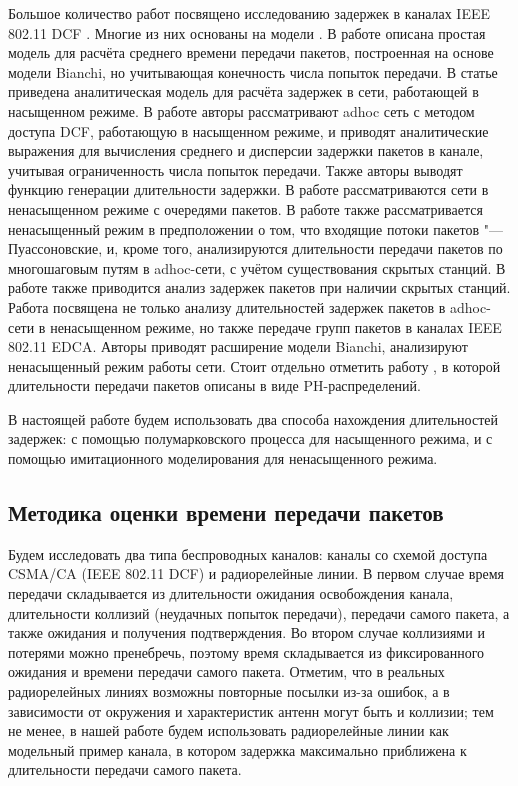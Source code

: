 Большое количество работ посвящено исследованию задержек в каналах IEEE 802.11 DCF \cite{Banchs2006,Chatzimisios2002,Dai2013,Dong2008,Felemban2011,Haghani2011,Hung2007,Issariyakul2005,Sakurai2007,Tickoo2008,Vardakas2007}. Многие из них основаны на модели \cite{Bianchi2000}. В работе \cite{Chatzimisios2002} описана простая модель для расчёта среднего времени передачи пакетов, построенная на основе модели Bianchi, но учитывающая конечность числа попыток передачи. В статье \cite{Banchs2006} приведена аналитическая модель для расчёта задержек в сети, работающей в насыщенном режиме. В работе \cite{Sakurai2007} авторы рассматривают adhoc сеть с методом доступа DCF, работающую в насыщенном режиме, и приводят аналитические выражения для вычисления среднего и дисперсии задержки пакетов в канале, учитывая ограниченность числа попыток передачи. Также авторы выводят функцию генерации длительности задержки. В работе \cite{Vardakas2007} рассматриваются сети в ненасыщенном режиме с очередями пакетов. В работе \cite{Dong2008} также рассматривается ненасыщенный режим в предположении о том, что входящие потоки пакетов "--- Пуассоновские, и, кроме того, анализируются длительности передачи пакетов по многошаговым путям в adhoc-сети, с учётом существования скрытых станций. В работе \cite{Hung2007} также приводится анализ задержек пакетов при наличии скрытых станций. Работа \cite{Tickoo2008} посвящена не только анализу длительностей задержек пакетов в adhoc-сети в ненасыщенном режиме, но также передаче групп пакетов в каналах IEEE 802.11 EDCA. Авторы \cite{Felemban2011} приводят расширение модели Bianchi, анализируют ненасыщенный режим работы сети. Стоит отдельно отметить работу \cite{Issariyakul2005}, в которой длительности передачи пакетов описаны в виде PH-распределений.

В настоящей работе будем использовать два способа нахождения длительностей задержек: с помощью полумарковского процесса для насыщенного режима, и с помощью имитационного моделирования для ненасыщенного режима. 


\subsection{Методика оценки времени передачи пакетов}
Будем исследовать два типа беспроводных каналов: каналы со схемой доступа CSMA/CA (IEEE 802.11 DCF) и радиорелейные линии. В первом случае время передачи складывается из длительности ожидания освобождения канала, длительности коллизий (неудачных попыток передачи), передачи самого пакета, а также ожидания и получения подтверждения. Во втором случае коллизиями и потерями можно пренебречь, поэтому время складывается из фиксированного ожидания и времени передачи самого пакета. Отметим, что в реальных радиорелейных линиях возможны повторные посылки из-за ошибок, а в зависимости от окружения и характеристик антенн могут быть и коллизии; тем не менее, в нашей работе будем использовать радиорелейные линии как модельный пример канала, в котором задержка максимально приближена к длительности передачи самого пакета.

